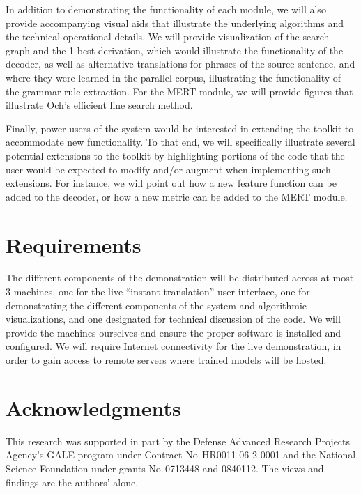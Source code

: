 \documentclass[11pt]{article}
\begin{document}
In addition to demonstrating the functionality of each module, we will also
provide accompanying visual aids that illustrate the underlying algorithms and
the technical operational details.  We will provide visualization of the search
graph and the 1-best derivation, which would illustrate the functionality of
the decoder, as well as alternative translations for phrases of the source
sentence, and where they were learned in the parallel corpus, illustrating the
functionality of the grammar rule extraction.  For the MERT module, we will
provide figures that illustrate Och's efficient line search method.

Finally, power users of the system would be interested in extending the toolkit
to accommodate new functionality.  To that end, we will specifically illustrate
several potential extensions to the toolkit by highlighting portions of the
code that the user would be expected to modify and/or augment when implementing
such extensions.  For instance, we will point out how a new feature function
can be added to the decoder, or how a new metric can be added to the MERT
module.

\section{Requirements}

The different components of the demonstration will be distributed across at most 3 machines, one for the live ``instant translation'' user interface, one for demonstrating the different components of the system and algorithmic visualizations, and one designated for technical discussion of the code.  We will provide the machines ourselves and ensure the proper software is installed and configured.  We will require Internet connectivity for the live demonstration, in order to gain access to remote servers where trained models will be hosted.



\section*{Acknowledgments}
This research was supported in part by the Defense Advanced Research Projects Agency's GALE program under Contract No.\,HR0011-06-2-0001 and the National Science Foundation under grants No.\,0713448 and 0840112. The views and findings are the authors' alone.




\end{document}
